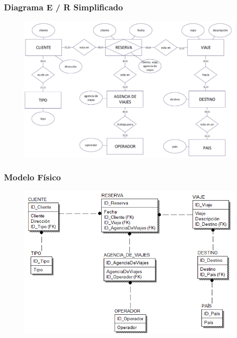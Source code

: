 \documentclass[12pt,letterpaper]{article}
\begin{document}
\subsubsection{\textbf{Diagrama E / R Simplificado}}

	\begin{figure}[htb]
		\begin{center}
			\includegraphics[width=12cm]{./IMAGENES/Ejercicio_2}
			
		\end{center}
	\end{figure}

\subsubsection{\textbf{Modelo Físico }}

	\begin{figure}[htb]
		\begin{center}
			\includegraphics[width=12cm]{./Imagenes/mod_fisico_2}
			
		\end{center}
	\end{figure}
\end{document}
